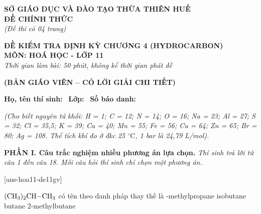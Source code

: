 \documentclass[12pt,a4paper]{article}
\begin{document}
\thispagestyle{firstpage}

\noindent
\begin{minipage}[t]{0.44\textwidth}
	\centering\fontsize{10pt}{12pt}\selectfont
	\textbf{SỞ GIÁO DỤC VÀ ĐÀO TẠO THỪA THIÊN HUẾ}\\
	\textbf{ĐỀ CHÍNH THỨC}\\
	\textit{(Đề thi có 04 trang)}
\end{minipage}\hfill
\begin{minipage}[t]{0.54\textwidth}
	\centering\fontsize{10.5pt}{13pt}\selectfont
	\textbf{ĐỀ KIỂM TRA ĐỊNH KỲ CHƯƠNG 4 (HYDROCARBON)}\\
	\textbf{MÔN: HOÁ HỌC - LỚP 11}\\
	\textit{Thời gian làm bài: 50 phút, không kể thời gian phát đề}
	
	\smallskip
\end{minipage}

\smallskip
\begin{center}
	{\color{hfRed}\textbf{\large (BẢN GIÁO VIÊN -- CÓ LỜI GIẢI CHI TIẾT)}}
\end{center}

\smallskip
\noindent\hrulefill
\smallskip

\noindent\textbf{Họ, tên thí sinh:} \dotfill\ \textbf{Lớp:} \dotfill\ \textbf{Số báo danh:} \dotfill

\smallskip
\noindent\textit{(Cho biết nguyên tử khối: H = 1; C = 12; N = 14; O = 16; Na = 23; Al = 27; S = 32; Cl = 35,5; K = 39; Ca = 40; Mn = 55; Fe = 56; Cu = 64; Zn = 65; Br = 80; Ag = 108. Thể tích khí đo ở đkc 25 $^\circ\text{C}$, 1 bar là 24,79 L/mol).}
\smallskip

\noindent\textbf{\large PHẦN I. Câu trắc nghiệm nhiều phương án lựa chọn.}
\textit{Thí sinh trả lời từ câu 1 đến câu 18. Mỗi câu hỏi thí sinh chỉ chọn một phương án.}
\vspace{0.2cm}

[ans-hoa11-de11gv]

\begin{ex}
 $\ce{(CH3)2CH-CH3}$ có tên theo danh pháp thay thế là
\choice
{-methylpropane}
{isobutane}
{butane}
{2-methylbutane}
\end{ex}
\end{document}
